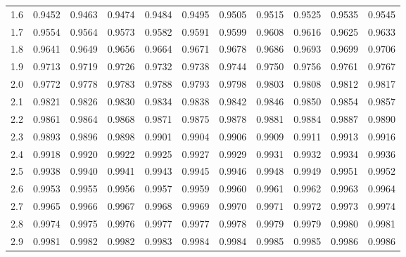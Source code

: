 \documentclass[11pt]{article}
\begin{document}
\begin{center}
\begin{tabular}{|c!{\color{gray!85}\vrule width 3.2pt}c|c|c|c|c|c|c|c|c|c|}
			1.6 & 0.9452 & 0.9463 & 0.9474 & 0.9484 & 0.9495 & 0.9505 & 0.9515 & 0.9525 & 0.9535 & 0.9545\\
			1.7 & 0.9554 & 0.9564 & 0.9573 & 0.9582 & 0.9591 & 0.9599 & 0.9608 & 0.9616 & 0.9625 & 0.9633\\
			1.8 & 0.9641 & 0.9649 & 0.9656 & 0.9664 & 0.9671 & 0.9678 & 0.9686 & 0.9693 & 0.9699 & 0.9706\\
			1.9 & 0.9713 & 0.9719 & 0.9726 & 0.9732 & 0.9738 & 0.9744 & 0.9750 & 0.9756 & 0.9761 & 0.9767\\
			2.0 & 0.9772 & 0.9778 & 0.9783 & 0.9788 & 0.9793 & 0.9798 & 0.9803 & 0.9808 & 0.9812 & 0.9817\\
			2.1 & 0.9821 & 0.9826 & 0.9830 & 0.9834 & 0.9838 & 0.9842 & 0.9846 & 0.9850 & 0.9854 & 0.9857\\
			2.2 & 0.9861 & 0.9864 & 0.9868 & 0.9871 & 0.9875 & 0.9878 & 0.9881 & 0.9884 & 0.9887 & 0.9890\\
			2.3 & 0.9893 & 0.9896 & 0.9898 & 0.9901 & 0.9904 & 0.9906 & 0.9909 & 0.9911 & 0.9913 & 0.9916\\
			2.4 & 0.9918 & 0.9920 & 0.9922 & 0.9925 & 0.9927 & 0.9929 & 0.9931 & 0.9932 & 0.9934 & 0.9936\\
			2.5 & 0.9938 & 0.9940 & 0.9941 & 0.9943 & 0.9945 & 0.9946 & 0.9948 & 0.9949 & 0.9951 & 0.9952\\
			2.6 & 0.9953 & 0.9955 & 0.9956 & 0.9957 & 0.9959 & 0.9960 & 0.9961 & 0.9962 & 0.9963 & 0.9964\\
			2.7 & 0.9965 & 0.9966 & 0.9967 & 0.9968 & 0.9969 & 0.9970 & 0.9971 & 0.9972 & 0.9973 & 0.9974\\
			2.8 & 0.9974 & 0.9975 & 0.9976 & 0.9977 & 0.9977 & 0.9978 & 0.9979 & 0.9979 & 0.9980 & 0.9981\\
			2.9 & 0.9981 & 0.9982 & 0.9982 & 0.9983 & 0.9984 & 0.9984 & 0.9985 & 0.9985 & 0.9986 & 0.9986\\
			\hline
		\end{tabular}
	\end{center}
	
\end{document}
